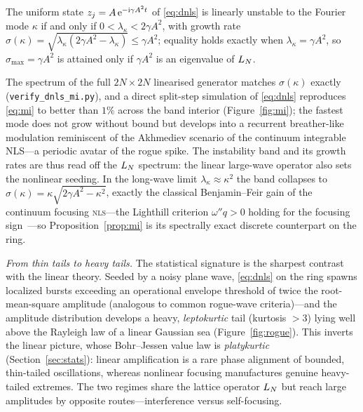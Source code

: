 \begin{proposition}\label{prop:mi}
The uniform state $z_j=A\,\mathrm{e}^{-\mathrm i\gamma A^2t}$ of \eqref{eq:dnls} is linearly unstable to the
Fourier mode $\kappa$ if and only if $0<\lambda_\kappa<2\gamma A^2$, with growth rate
$\sigma(\kappa)=\sqrt{\lambda_\kappa(2\gamma A^2-\lambda_\kappa)}\le\gamma A^2$; equality holds exactly when
$\lambda_\kappa=\gamma A^2$, so $\sigma_{\max}=\gamma A^2$ is attained only if $\gamma A^2$ is an eigenvalue of $L_N$.
\end{proposition} The spectrum of the full $2N\times2N$ linearised generator matches $\sigma(\kappa)$
exactly (\texttt{verify\_dnls\_mi.py}), and a direct split-step simulation of \eqref{eq:dnls} reproduces
\eqref{eq:mi} to better than $1\%$ across the band interior (Figure~\ref{fig:mi}); the fastest mode
does not grow without bound but develops into a recurrent breather-like modulation reminiscent of the
Akhmediev scenario of the continuum integrable NLS---a periodic avatar of the rogue spike. The
instability band and its growth rates are thus read off the $L_N$ spectrum: the linear large-wave
operator also sets the nonlinear seeding. In the long-wave limit $\lambda_\kappa\approx\kappa^2$ the band
collapses to $\sigma(\kappa)=\kappa\sqrt{2\gamma A^2-\kappa^2}$, exactly the classical Benjamin--Feir gain of
the continuum focusing \textsc{nls}---the Lighthill criterion $\omega''q>0$ holding for the focusing
sign~\cite{Lighthill,RyskinTrubetskov}---so Proposition~\ref{prop:mi} is its spectrally exact discrete
counterpart on the ring.

\emph{From thin tails to heavy tails.} The statistical signature is the sharpest contrast with the
linear theory. Seeded by a noisy plane wave, \eqref{eq:dnls} on the ring spawns localized bursts exceeding an operational envelope threshold of twice
the root-mean-square amplitude (analogous to common rogue-wave criteria)---and the amplitude
distribution develops a heavy, \emph{leptokurtic} tail (kurtosis $>3$) lying well above the Rayleigh
law of a linear Gaussian sea (Figure~\ref{fig:rogue}). This inverts the linear picture, whose
Bohr--Jessen value law is \emph{platykurtic} (Section~\ref{sec:stats}): linear amplification is a rare
phase alignment of bounded, thin-tailed oscillations, whereas nonlinear focusing manufactures genuine
heavy-tailed extremes. The two regimes share the lattice operator $L_N$ but reach large amplitudes by
opposite routes---interference versus self-focusing.

